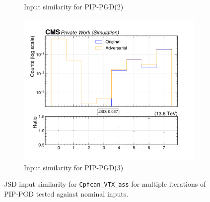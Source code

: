 \begin{figure}[htbp]
\begin{subfigure}[t]{0.32\textwidth}
    \caption*{Input similarity for PIP-PGD(2)}
  \end{subfigure}\hfill
  \begin{subfigure}[t]{0.32\textwidth}
    \includegraphics[width=\linewidth]{media/output/features/compare/combined_it_3/cmp_cpf_arr_Cpfcan_VTX_ass.pdf}
    \caption*{Input similarity for PIP-PGD(3)}
  \end{subfigure}

  \caption*{JSD input similarity for \texttt{Cpfcan\_VTX\_ass} for multiple iterations of PIP-PGD tested against nominal inputs.}
  \label{fig:combined_input_Cpfcan_VTX_ass}
\end{figure}

